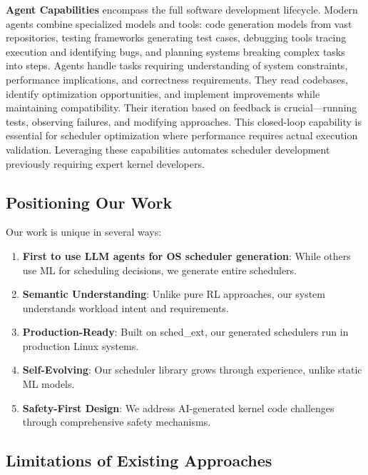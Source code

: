 \textbf{Agent Capabilities} encompass the full software development lifecycle. Modern agents combine specialized models and tools: code generation models from vast repositories, testing frameworks generating test cases, debugging tools tracing execution and identifying bugs, and planning systems breaking complex tasks into steps. Agents handle tasks requiring understanding of system constraints, performance implications, and correctness requirements. They read codebases, identify optimization opportunities, and implement improvements while maintaining compatibility. Their iteration based on feedback is crucial—running tests, observing failures, and modifying approaches. This closed-loop capability is essential for scheduler optimization where performance requires actual execution validation. Leveraging these capabilities automates scheduler development previously requiring expert kernel developers.

\subsection{Positioning Our Work}

Our work is unique in several ways:

\begin{enumerate}
\item \textbf{First to use LLM agents for OS scheduler generation}: While others use ML for scheduling decisions, we generate entire schedulers.

\item \textbf{Semantic Understanding}: Unlike pure RL approaches, our system understands workload intent and requirements.

\item \textbf{Production-Ready}: Built on sched\_ext, our generated schedulers run in production Linux systems.

\item \textbf{Self-Evolving}: Our scheduler library grows through experience, unlike static ML models.

\item \textbf{Safety-First Design}: We address AI-generated kernel code challenges through comprehensive safety mechanisms.
\end{enumerate}

\subsection{Limitations of Existing Approaches}

